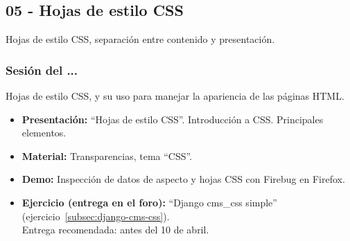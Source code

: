 \documentclass[a4paper,12pt]{article}
\begin{document}
%
%
%
%
\subsection{05 - Hojas de estilo CSS}

Hojas de estilo CSS, separación entre contenido y presentación.

\subsubsection{Sesión del ...}

Hojas de estilo CSS, y su uso para manejar la apariencia de las páginas HTML.

\begin{itemize}
\item \textbf{Presentación:} ``Hojas de estilo CSS''. Introducción a CSS. Principales elementos.
 \item \textbf{Material:} Transparencias, tema ``CSS''.
\item \textbf{Demo:} Inspección de datos de aspecto y hojas CSS con Firebug en Firefox.
\item \textbf{Ejercicio (entrega en el foro):} ``Django cms\_css simple'' (ejercicio~\ref{subsec:django-cms-css}). \\
Entrega recomendada: antes del 10 de abril.
\end{itemize}
\end{document}
